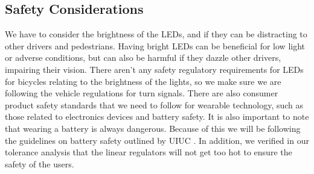 \documentclass[12pt]{article}
\begin{document}
\subsection{Safety Considerations}
We have to consider the brightness of the LEDs, and if they can be distracting to other drivers and pedestrians. Having bright LEDs can be beneficial for low light or adverse conditions, but can also be harmful if they dazzle other drivers, impairing their vision. There aren’t any safety regulatory requirements for LEDs for bicycles relating to the brightness of the lights, so we make sure we are following the vehicle regulations for turn signals. \cite{CFR571_108} There are also consumer product safety standards that we need to follow for wearable technology, such as those related to electronics devices and battery safety. It is also important to note that wearing a battery is always dangerous. Because of this we will be following the guidelines on battery safety outlined by UIUC \cite{UIUCBatterySafety2023}. In addition, we verified in our tolerance analysis that the linear regulators will not get too hot to ensure the safety of the users.


\newpage

\end{document}

